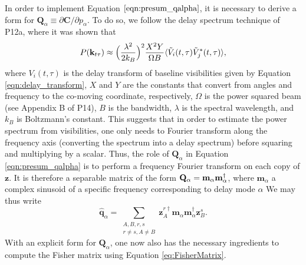 \documentclass[twocolumn,numberedappendix]{emulateapj} \shorttitle{PSA64}
\newcommand{\qhat}{\hat{\mathbf{q}}}
\begin{document}
In order to implement Equation $\eqref{eqn:presum_qalpha}$, it is necessary to derive a form for
$\mathbf{Q}_\alpha \equiv \partial \mathbf{C} / \partial p_\alpha$. To do so, we follow the delay
spectrum technique of P12a, where it was shown that
\begin{equation}\label{eqn:delay_pspec}
    P(\mathbf{k}_{t\tau}) \approx
\Big(\frac{\lambda^{2}}{2k_{B}}\Big)^{2}\frac{X^{2}Y}{\Omega
B}\expval{\tilde{V}_{i}(t,\tau)\tilde{V}_{j}^{*}(t,\tau)},
\end{equation}
where $V_{i}(t,\tau)$ is the delay transform of baseline visibilities given by Equation \eqref{eqn:delay_transform}, $X$ and
$Y$ are the constants that convert from angles and frequency to the co-moving
coordinate, respectively, $\Omega$ is the power squared beam (see Appendix B of
P14), $B$ is the bandwidth, $\lambda$ is the spectral wavelength, and $k_{B}$ is Boltzmann's constant.
This suggests that in order to estimate the power spectrum from visibilities, one only needs
to Fourier transform along the frequency axis (converting the spectrum into a delay spectrum)
before squaring and multiplying by a scalar. Thus, the role of $\mathbf{Q}_\alpha$ in Equation \eqref{eqn:presum_qalpha} is to perform a frequency Fourier transform on each copy of
$\mathbf{z}$. It is therefore a separable matrix of the form $\mathbf{Q}_{\alpha} =
\mathbf{m}_{\alpha}\mathbf{m}_{\alpha}^{\dagger}$, where $\mathbf{m}_{\alpha}$ a
complex sinusoid of a specific frequency corresponding to delay mode $\alpha$
We may thus write
\begin{equation}
    \qhat_{\alpha} =
\sum_{\substack{A,B,r,s\\r\ne{s},A\ne{B}}}\mathbf{z}^{r\dagger}_{A}\mathbf{m}_{\alpha}\mathbf{m}_{\alpha}^{\dagger} \mathbf{z}^{s}_{B}.
\end{equation}
With an explicit form for $\mathbf{Q}_\alpha$, one now also has the necessary ingredients
to compute the Fisher matrix using Equation \eqref{eq:FisherMatrix}.
\end{document}
